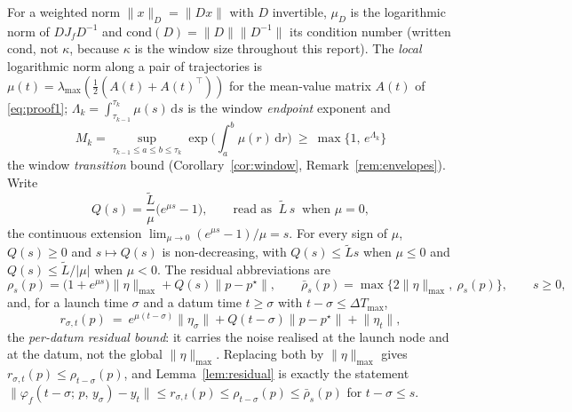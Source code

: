 \documentclass[11pt]{article}
\theoremstyle{remark}\newtheorem{remark}{Remark}
\newcommand{\pstar}{p^\star}
\newcommand{\norm}[1]{\lVert #1\rVert}
\newcommand{\flow}[3]{\varphi_f(#1;\,#2,\,#3)}
\newcommand{\dd}{\,\mathrm{d}}
\begin{document}
For a weighted norm $\norm{x}_D=\norm{Dx}$ with $D$ invertible, $\mu_D$ is the logarithmic norm of $DJ_fD^{-1}$ and $\mathrm{cond}(D)=\norm{D}\norm{D^{-1}}$ its condition number (written $\mathrm{cond}$, not $\kappa$, because $\kappa$ is the window size throughout this report). The \emph{local} logarithmic norm along a pair of trajectories is $\mu(t)=\lambda_{\max}(\tfrac12(A(t)+A(t)^\top))$ for the mean-value matrix $A(t)$ of \eqref{eq:proof1}; $\Lambda_k=\int_{\tau_{k-1}}^{\tau_k}\mu(s)\dd s$ is the window \emph{endpoint} exponent and
\begin{equation}
M_k=\sup_{\tau_{k-1}\le a\le b\le\tau_k}\exp\Big(\int_a^b\mu(r)\dd r\Big)\ \ge\ \max\{1,\,e^{\Lambda_k}\}
\label{eq:Mk}
\end{equation}
the window \emph{transition} bound (Corollary~\ref{cor:window}, Remark~\ref{rem:envelopes}). Write
\begin{equation}
Q(s)=\frac{\tilde L}{\mu}\big(e^{\mu s}-1\big),\qquad\text{read as }\ \tilde L\,s\ \text{ when }\mu=0,
\label{eq:Qdef}
\end{equation}
the continuous extension $\lim_{\mu\to0}(e^{\mu s}-1)/\mu=s$. For every sign of $\mu$, $Q(s)\ge0$ and $s\mapsto Q(s)$ is non-decreasing, with $Q(s)\le\tilde L s$ when $\mu\le0$ and $Q(s)\le\tilde L/|\mu|$ when $\mu<0$. The residual abbreviations are
\begin{equation}
\rho_s(p)=\big(1+e^{\mu s}\big)\norm{\eta}_{\max}+Q(s)\norm{p-\pstar},
\qquad
\bar\rho_s(p)=\max\big\{2\norm\eta_{\max},\ \rho_s(p)\big\},\qquad s\ge0 ,
\label{eq:rho}
\end{equation}
and, for a launch time $\sigma$ and a datum time $t\ge\sigma$ with $t-\sigma\le\Delta T_{\max}$,
\begin{equation}
r_{\sigma,t}(p)\ =\ e^{\mu(t-\sigma)}\norm{\eta_\sigma}+Q(t-\sigma)\norm{p-\pstar}+\norm{\eta_t},
\label{eq:rdatum}
\end{equation}
the \emph{per-datum residual bound}: it carries the noise realised at the launch node and at the datum, not the global $\norm\eta_{\max}$. Replacing both by $\norm\eta_{\max}$ gives $r_{\sigma,t}(p)\le\rho_{t-\sigma}(p)$, and Lemma~\ref{lem:residual} is exactly the statement $\norm{\flow{t-\sigma}{p}{y_\sigma}-y_t}\le r_{\sigma,t}(p)\le\rho_{t-\sigma}(p)\le\bar\rho_s(p)$ for $t-\sigma\le s$.
\end{document}
